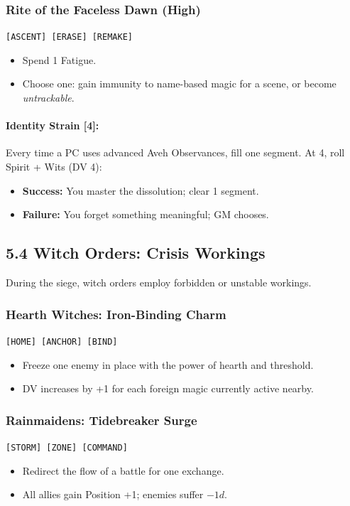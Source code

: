 \documentclass[11pt]{book}
\begin{document}
\subsubsection*{Rite of the Faceless Dawn (High)}
\texttt{[ASCENT] [ERASE] [REMAKE]}
\begin{itemize}
    \item Spend 1 Fatigue.
    \item Choose one: gain immunity to name-based magic for a scene, or become \emph{untrackable}.
\end{itemize}

\paragraph{Identity Strain [4]:}  
Every time a PC uses advanced Aveh Observances, fill one segment.  
At 4, roll Spirit + Wits (DV 4):

\begin{itemize}
    \item \textbf{Success:} You master the dissolution; clear 1 segment.
    \item \textbf{Failure:} You forget something meaningful; GM chooses.
\end{itemize}

\subsection{5.4 Witch Orders: Crisis Workings}

During the siege, witch orders employ forbidden or unstable workings.

\subsubsection*{Hearth Witches: Iron-Binding Charm}
\texttt{[HOME] [ANCHOR] [BIND]}
\begin{itemize}
    \item Freeze one enemy in place with the power of hearth and threshold.
    \item DV increases by +1 for each foreign magic currently active nearby.
\end{itemize}

\subsubsection*{Rainmaidens: Tidebreaker Surge}
\texttt{[STORM] [ZONE] [COMMAND]}
\begin{itemize}
    \item Redirect the flow of a battle for one exchange.
    \item All allies gain Position +1; enemies suffer $-1d$.
\end{itemize}
\end{document}
